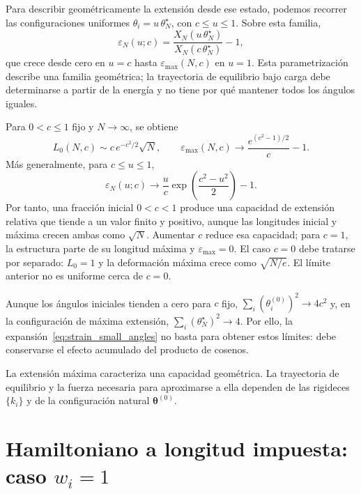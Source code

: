 \documentclass[11pt,a4paper]{article}
\begin{document}
Para describir geométricamente la extensión desde ese estado,
podemos recorrer las configuraciones uniformes
$\theta_i=u\,\theta_N^\star$, con $c\leq u\leq1$. Sobre esta familia,
\begin{equation}
\varepsilon_N(u;c)
=\frac{X_N(u\,\theta_N^\star)}{X_N(c\,\theta_N^\star)}-1,
\label{eq:strain_uniform_path}
\end{equation}
que crece desde cero en $u=c$ hasta $\varepsilon_{\max}(N,c)$
en $u=1$. Esta parametrización describe una familia geométrica;
la trayectoria de equilibrio bajo carga debe determinarse a partir
de la energía y no tiene por qué mantener todos los ángulos iguales.

Para $0<c\leq1$ fijo y $N\to\infty$, se obtiene
\begin{equation}
L_0(N,c)\sim c\,e^{-c^2/2}\sqrt{N},
\qquad
\boxed{
\varepsilon_{\max}(N,c)
\longrightarrow \frac{e^{(c^2-1)/2}}{c}-1.
}
\label{eq:strain_max_fraction_limit}
\end{equation}
Más generalmente, para $c\leq u\leq1$,
\begin{equation}
\varepsilon_N(u;c)
\longrightarrow
\frac{u}{c}\exp\!\left(\frac{c^2-u^2}{2}\right)-1.
\label{eq:strain_uniform_limit}
\end{equation}
Por tanto, una fracción inicial $0<c<1$ produce una capacidad de
extensión relativa que tiende a un valor finito y positivo, aunque
las longitudes inicial y máxima crecen ambas como $\sqrt{N}$.
Aumentar $c$ reduce esa capacidad; para $c=1$, la estructura parte
de su longitud máxima y $\varepsilon_{\max}=0$. El caso $c=0$
debe tratarse por separado: $L_0=1$ y la deformación máxima crece
como $\sqrt{N/e}$. El límite anterior no es uniforme cerca de $c=0$.

Aunque los ángulos iniciales tienden a cero para $c$ fijo,
$\sum_i(\theta_i^{(0)})^2\to4c^2$ y, en la configuración de
máxima extensión, $\sum_i(\theta_N^\star)^2\to4$. Por ello,
la expansión~\eqref{eq:strain_small_angles} no basta para obtener
estos límites: debe conservarse el efecto acumulado del producto
de cosenos.

La extensión máxima caracteriza una capacidad geométrica.
La trayectoria de equilibrio y la fuerza necesaria para aproximarse
a ella dependen de las rigideces $\{k_i\}$ y de la configuración
natural $\boldsymbol{\theta}^{(0)}$.

\section{Hamiltoniano a longitud impuesta: caso $w_i=1$}
\label{sec:hamiltonian}
\end{document}
